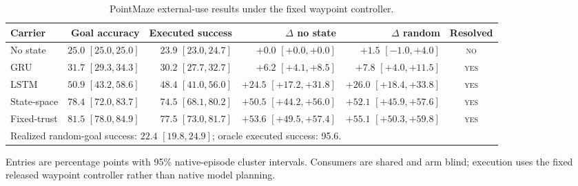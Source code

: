 \begin{table}[H]
\centering
\scriptsize
\setlength{\tabcolsep}{4pt}
\renewcommand{\arraystretch}{1.10}
\caption{PointMaze external-use results under the fixed waypoint controller.}
\label{tab:appendix-pointmaze-use}
\begin{tabular}{lrrrrc}
\toprule
Carrier & Goal accuracy & Executed success & $\Delta$ no state & $\Delta$ random & Resolved \\
\midrule
No state & $25.0$ $[25.0,25.0]$ & $23.9$ $[23.0,24.7]$ & $+0.0$ $[+0.0,+0.0]$ & $+1.5$ $[-1.0,+4.0]$ & \textsc{no} \\
GRU & $31.7$ $[29.3,34.3]$ & $30.2$ $[27.7,32.7]$ & $+6.2$ $[+4.1,+8.5]$ & $+7.8$ $[+4.0,+11.5]$ & \textsc{yes} \\
LSTM & $50.9$ $[43.2,58.6]$ & $48.4$ $[41.0,56.0]$ & $+24.5$ $[+17.2,+31.8]$ & $+26.0$ $[+18.4,+33.8]$ & \textsc{yes} \\
State-space & $78.4$ $[72.0,83.7]$ & $74.5$ $[68.1,80.2]$ & $+50.5$ $[+44.2,+56.0]$ & $+52.1$ $[+45.9,+57.6]$ & \textsc{yes} \\
Fixed-trust & $81.5$ $[78.0,84.9]$ & $77.5$ $[73.0,81.7]$ & $+53.6$ $[+49.5,+57.4]$ & $+55.1$ $[+50.3,+59.8]$ & \textsc{yes} \\
\midrule
\multicolumn{6}{l}{Realized random-goal success: $22.4$ $[19.8,24.9]$; oracle executed success: 95.6.} \\
\bottomrule
\end{tabular}
\vspace{2pt}
\parbox{0.98\textwidth}{\scriptsize Entries are percentage points with 95\% native-episode cluster intervals. Consumers are shared and arm blind; execution uses the fixed released waypoint controller rather than native model planning.}
\end{table}
